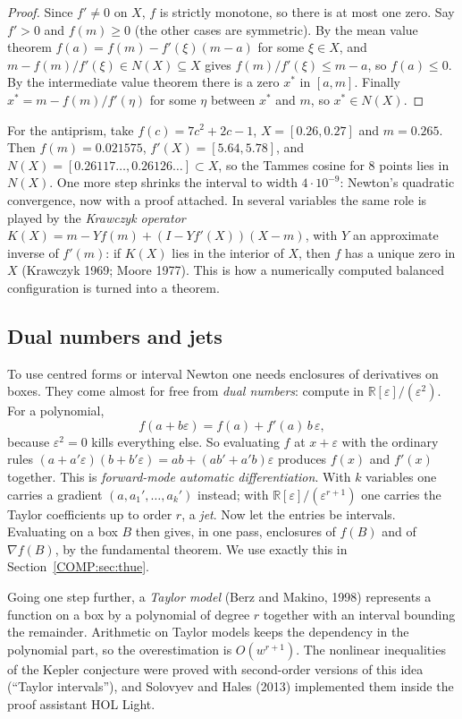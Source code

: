 \documentclass[11pt,openany]{book}
\theoremstyle{plain}
\theoremstyle{definition}
\theoremstyle{remark}
\newcommand{\R}{\mathbb{R}}
\begin{document}
\begin{proof}
Since $f'\ne0$ on $X$, $f$ is strictly monotone, so there is at most one zero. Say $f'>0$ and $f(m)\ge0$ (the
other cases are symmetric). By the mean value theorem $f(a)=f(m)-f'(\xi)(m-a)$ for some $\xi\in X$, and
$m-f(m)/f'(\xi)\in N(X)\subseteq X$ gives $f(m)/f'(\xi)\le m-a$, so $f(a)\le0$. By the intermediate value
theorem there is a zero $x^*$ in $[a,m]$. Finally $x^*=m-f(m)/f'(\eta)$ for some $\eta$ between $x^*$ and $m$,
so $x^*\in N(X)$.
\end{proof}

For the antiprism, take $f(c)=7c^2+2c-1$, $X=[0.26,0.27]$ and $m=0.265$. Then $f(m)=0.021575$,
$f'(X)=[5.64,5.78]$, and $N(X)=[0.26117\ldots,0.26126\ldots]\subset X$, so the Tammes cosine for $8$ points
lies in $N(X)$. One more step shrinks the interval to width $4\cdot10^{-9}$: Newton's quadratic convergence,
now with a proof attached. In several variables the same role is played by the \emph{Krawczyk operator}
$K(X)=m-Yf(m)+(I-Yf'(X))(X-m)$, with $Y$ an approximate inverse of $f'(m)$: if $K(X)$ lies in the interior of
$X$, then $f$ has a unique zero in $X$ (Krawczyk 1969; Moore 1977). This is how a numerically computed
balanced configuration is turned into a theorem.

\subsection{Dual numbers and jets}
To use centred forms or interval Newton one needs enclosures of derivatives on boxes. They come almost for
free from \emph{dual numbers}: compute in $\R[\varepsilon]/(\varepsilon^2)$. For a polynomial,
\[
  f(a+b\varepsilon)=f(a)+f'(a)\,b\,\varepsilon,
\]
because $\varepsilon^2=0$ kills everything else. So evaluating $f$ at $x+\varepsilon$ with the ordinary rules
$(a+a'\varepsilon)(b+b'\varepsilon)=ab+(ab'+a'b)\varepsilon$ produces $f(x)$ and $f'(x)$ together. This is
\emph{forward-mode automatic differentiation}. With $k$ variables one carries a gradient
$(a,a_1',\dots,a_k')$ instead; with $\R[\varepsilon]/(\varepsilon^{r+1})$ one carries the Taylor coefficients
up to order $r$, a \emph{jet}. Now let the entries be intervals. Evaluating on a box $B$ then gives, in one
pass, enclosures of $f(B)$ and of $\nabla f(B)$, by the fundamental theorem. We use exactly this in
Section~\ref{COMP:sec:thue}.

Going one step further, a \emph{Taylor model} (Berz and Makino, 1998) represents a function on a box by a
polynomial of degree $r$ together with an interval bounding the remainder. Arithmetic on Taylor models
keeps the dependency in the polynomial part, so the overestimation is $O(w^{r+1})$. The nonlinear inequalities
of the Kepler conjecture were proved with second-order versions of this idea (``Taylor intervals''), and
Solovyev and Hales (2013) implemented them inside the proof assistant HOL Light.
\end{document}
